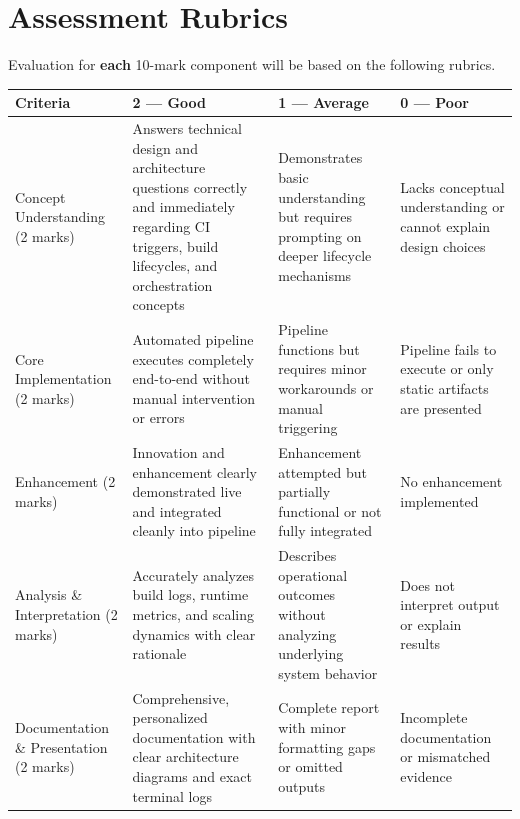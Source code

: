 \documentclass[12pt,a4paper]{article}
\newcommand{\sizeTwelve}{\fontsize{12pt}{15pt}\selectfont}
\begin{document}
\newpage

\section*{Assessment Rubrics}
{\sizeTwelve Evaluation for \textbf{each} 10-mark component will be based on the following rubrics.\par}

\vspace{0.4cm}

{\sizeTwelve
\setlength{\tabcolsep}{4pt}
\renewcommand{\arraystretch}{1.25}
\begin{longtable}{|>{\raggedright\arraybackslash}p{3.0cm}|>{\raggedright\arraybackslash}p{3.5cm}|>{\raggedright\arraybackslash}p{3.5cm}|>{\raggedright\arraybackslash}p{3.5cm}|}
\hline

\textbf{Criteria} & \textbf{2 --- Good} & \textbf{1 --- Average} & \textbf{0 --- Poor} \\

\hline
\endhead
Concept Understanding (2 marks) & Answers technical design and architecture questions correctly and immediately regarding CI triggers, build lifecycles, and orchestration concepts & Demonstrates basic understanding but requires prompting on deeper lifecycle mechanisms & Lacks conceptual understanding or cannot explain design choices \\
\hline
Core Implementation (2 marks) & Automated pipeline executes completely end-to-end without manual intervention or errors & Pipeline functions but requires minor workarounds or manual triggering & Pipeline fails to execute or only static artifacts are presented \\
\hline
Enhancement (2 marks) & Innovation and enhancement clearly demonstrated live and integrated cleanly into pipeline & Enhancement attempted but partially functional or not fully integrated & No enhancement implemented \\
\hline
Analysis \& Interpretation (2 marks) & Accurately analyzes build logs, runtime metrics, and scaling dynamics with clear rationale & Describes operational outcomes without analyzing underlying system behavior & Does not interpret output or explain results \\
\hline
Documentation \& Presentation (2 marks) & Comprehensive, personalized documentation with clear architecture diagrams and exact terminal logs & Complete report with minor formatting gaps or omitted outputs & Incomplete documentation or mismatched evidence \\
\hline
\end{longtable}
\par}
\end{document}
